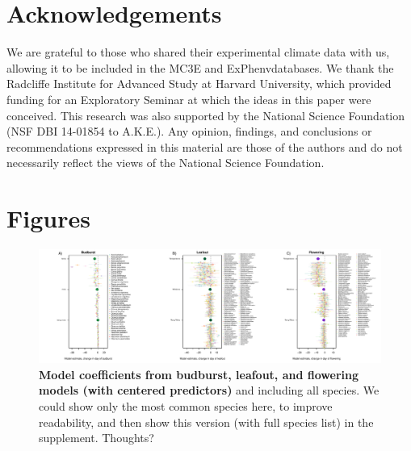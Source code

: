 \documentclass{article}
\begin{document}

\section* {Acknowledgements}

We are grateful to those who shared their experimental climate data with us, allowing it to be included in the MC3E and ExPhenvdatabases. We thank the Radcliffe Institute for Advanced Study at Harvard University, which provided funding for an Exploratory Seminar at which the ideas in this paper were conceived. This research was also supported by the National Science Foundation (NSF DBI 14-01854 to A.K.E.). Any opinion, findings, and conclusions or recommendations expressed in this material are those of the authors and do not necessarily reflect the views of the National Science Foundation.



\section*{Figures}


\begin{figure}[h]
\centering
 \includegraphics{../../Analyses/soilmoisture/figures/m5_bbdlofl.pdf}
 \caption{\textbf{Model coefficients from budburst, leafout, and flowering models (with centered predictors)} and including all species. We could show only the most common species here, to improve readability, and then show this version (with full species list) in the supplement. Thoughts?} 
 \label{fig:bblofl}
 \end{figure}
 
\end{document}
